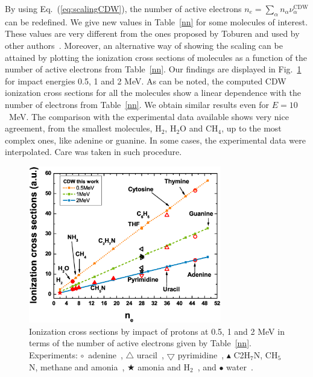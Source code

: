 \documentclass[preprint,12pt]{article}
\begin{document}
By using Eq.~(\ref{eq:scalingCDW}), the number of active electrons 
$n_e=\sum_{\alpha} n_{\alpha} \nu_{\alpha}^{\text{CDW}}$ can be redefined. 
We give new values in Table~\ref{nn} for some molecules of interest.
These values are very different from the ones proposed by Toburen and used by 
other authors~\cite{itoh2013}.
Moreover, an alternative way of showing the scaling can be attained by 
plotting the ionization cross sections of molecules as a function of the 
number of active electrons from Table~\ref{nn}. Our findings are displayed 
in Fig.~\ref{fig:recta} for impact energies 0.5, 1 and 2 MeV. As can be 
noted, the computed CDW ionization cross sections for all the molecules  
show a linear dependence with the number of electrons from Table~\ref{nn}. 
We obtain similar results even for $E=10$~MeV. The comparison with the 
experimental data available shows very nice agreement, from the smallest 
molecules, H$_2$, H$_2$O and CH$_4$, up to the most complex ones, like 
adenine or guanine. In some cases, the experimental data were interpolated.
Care was taken in such procedure.

\begin{figure}[t!]
\centering
\includegraphics[width=0.75\textwidth]{figuras/Fig_finales/fig_recta.eps}
\caption{Ionization cross sections by impact of protons at 0.5, 1 and 2 MeV
in terms of the number of active electrons given by Table~\ref{nn}.
Experiments: $\circ$~adenine~\cite{iriki2011}, $\triangle$ uracil~\cite{itoh2013}, 
$\bigtriangledown$ pyrimidine~\cite{wolff2014}, 
$\blacktriangle$ C2H$_7$N, CH$_5$N, methane and amonia~\cite{lynch1976},
$\bigstar$ amonia and H$_2$~\cite{rudd1985}, and $\bullet$ water~\cite{luna2007}.}
\label{fig:recta}
\end{figure}
\end{document}
